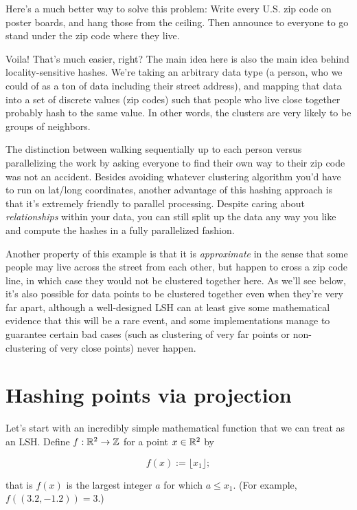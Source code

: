 \documentclass[20pt,]{extarticle}
\begin{document}
Here's a much better way to solve this problem: Write every U.S. zip
code on poster boards, and hang those from the ceiling. Then announce to
everyone to go stand under the zip code where they live.

Voila! That's much easier, right? The main idea here is also the main
idea behind locality-sensitive hashes. We're taking an arbitrary data
type (a person, who we could of as a ton of data including their street
address), and mapping that data into a set of discrete values (zip
codes) such that people who live close together probably hash to the
same value. In other words, the clusters are very likely to be groups of
neighbors.

The distinction between walking sequentially up to each person versus
parallelizing the work by asking everyone to find their own way to their
zip code was not an accident. Besides avoiding whatever clustering
algorithm you'd have to run on lat/long coordinates, another advantage
of this hashing approach is that it's extremely friendly to parallel
processing. Despite caring about \emph{relationships} within your data,
you can still split up the data any way you like and compute the hashes
in a fully parallelized fashion.

Another property of this example is that it is \emph{approximate} in the
sense that some people may live across the street from each other, but
happen to cross a zip code line, in which case they would not be
clustered together here. As we'll see below, it's also possible for data
points to be clustered together even when they're very far apart,
although a well-designed LSH can at least give some mathematical
evidence that this will be a rare event, and some implementations manage
to guarantee certain bad cases (such as clustering of very far points or
non-clustering of very close points) never happen.

\section{Hashing points via
projection}\label{hashing-points-via-projection}

Let's start with an incredibly simple mathematical function that we can
treat as an LSH. Define \(f:\mathbb{R}^2 \to \mathbb{Z}\) for a point \(x\in\mathbb{R}^2\) by

\[ f(x) := \lfloor x_1 \rfloor; \]

that is \(f(x)\) is the largest integer \(a\) for which \(a\le x_1.\)
(For example, \(f((3.2, -1.2)) = 3.\))
\end{document}
